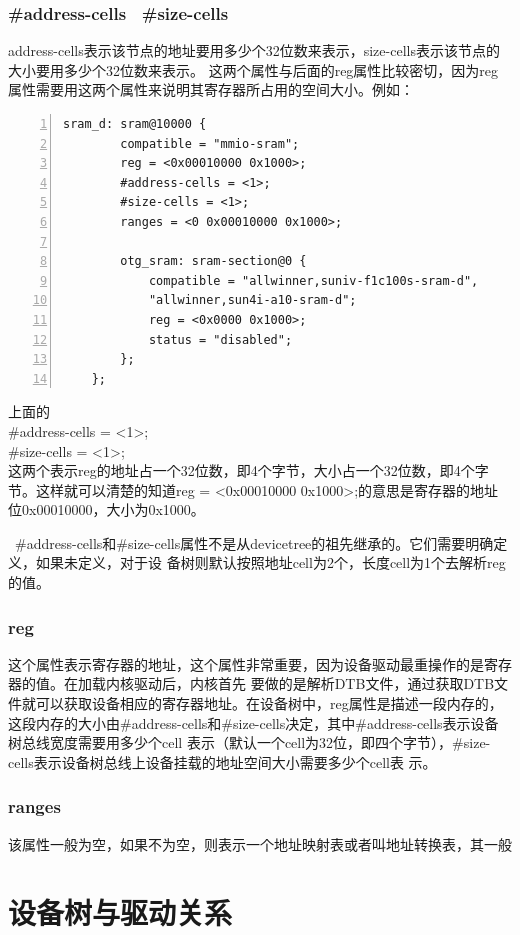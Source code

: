 \subsubsection{ \#address-cells \  \#size-cells}
address-cells表示该节点的地址要用多少个32位数来表示，size-cells表示该节点的大小要用多少个32位数来表示。
这两个属性与后面的reg属性比较密切，因为reg属性需要用这两个属性来说明其寄存器所占用的空间大小。例如：
\begin{lstlisting}[language={[ANSI]C},numbers=left,numberstyle=\tiny,frame=shadowbox,
	rulesepcolor=\color{red!20!green!20!blue!20},
	keywordstyle=\color{blue!70!black},
	commentstyle=\color{blue!90!},
	basicstyle=\ttfamily]
	sram_d: sram@10000 {
		compatible = "mmio-sram";
		reg = <0x00010000 0x1000>;
		#address-cells = <1>;
		#size-cells = <1>;
		ranges = <0 0x00010000 0x1000>;
		
		otg_sram: sram-section@0 {
			compatible = "allwinner,suniv-f1c100s-sram-d",
			"allwinner,sun4i-a10-sram-d";
			reg = <0x0000 0x1000>;
			status = "disabled";
		};
	};
\end{lstlisting}
上面的\\
\#address-cells = <1>;\\
\#size-cells = <1>;\\
这两个表示reg的地址占一个32位数，即4个字节，大小占一个32位数，即4个字节。这样就可以清楚的知道reg = 
<0x00010000 0x1000>;的意思是寄存器的地址位0x00010000，大小为0x1000。

\begin{tcolorbox}[colback=red!5!white,colframe=red!75!black]
	\faWarning\  
	\#address-cells和\#size-cells属性不是从devicetree的祖先继承的。它们需要明确定义，如果未定义，对于设
	备树则默认按照地址cell为2个，长度cell为1个去解析reg的值。
\end{tcolorbox}







\subsubsection{reg}
这个属性表示寄存器的地址，这个属性非常重要，因为设备驱动最重操作的是寄存器的值。在加载内核驱动后，内核首先
要做的是解析DTB文件，通过获取DTB文件就可以获取设备相应的寄存器地址。在设备树中，reg属性是描述一段内存的，
这段内存的大小由\#address-cells和\#size-cells决定，其中\#address-cells表示设备树总线宽度需要用多少个cell
表示（默认一个cell为32位，即四个字节），\#size-cells表示设备树总线上设备挂载的地址空间大小需要多少个cell表
示。






\subsubsection{ranges}
该属性一般为空，如果不为空，则表示一个地址映射表或者叫地址转换表，其一般








\section{设备树与驱动关系}






